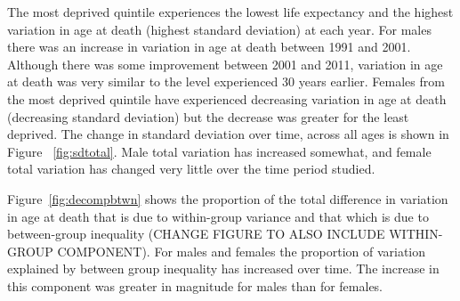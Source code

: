 \documentclass[12pt,oneside,a4paper]{article} %
\theoremstyle{definition}
\begin{document}
The most deprived quintile experiences the lowest life expectancy and
the highest variation in age at death (highest standard deviation) at each year. For males there was an
increase in variation in age at death between 1991 and 2001. Although there was
some improvement between 2001 and 2011, variation in age at death was very
similar to the level experienced 30 years earlier. Females from the most
deprived quintile have experienced decreasing variation in age at death (decreasing standard deviation) but the
decrease was greater for the least deprived. The change in standard
deviation over time, across all ages is shown in Figure ~\ref{fig:sdtotal}. Male
total variation has increased somewhat, and female total variation has changed
very little over the time period studied.

Figure~\ref{fig:decompbtwn} shows the proportion of the total difference in
variation in age at death that is due to within-group variance and that which is due to between-group inequality (CHANGE FIGURE TO ALSO INCLUDE WITHIN-GROUP COMPONENT). For males and females the proportion of variation explained by between group inequality has increased over time. The increase in this component was greater in magnitude for males than for females.
\end{document}
